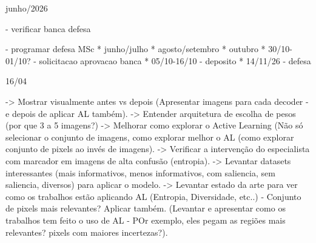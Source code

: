 
junho/2026

- verificar banca defesa

- programar defesa MSc
* junho/julho
* agosto/setembro
* outubro
* 30/10-01/10? - solicitacao aprovacao banca
* 05/10-16/10 - deposito
* 14/11/26 - defesa



16/04















    ->  Mostrar visualmente antes vs depois (Apresentar imagens para cada decoder - e depois de aplicar AL também).
    -> Entender arquitetura de escolha de pesos (por que 3 a 5 imagens?)
    -> Melhorar como explorar o Active Learning (Não só selecionar o conjunto de imagens, como explorar melhor o AL (como explorar conjunto de pixels ao invés de imagens).
    -> Verificar a intervenção do especialista com marcador em imagens de alta confusão (entropia).
    -> Levantar datasets interessantes (mais informativos, menos informativos, com saliencia, sem saliencia, diversos) para aplicar o modelo.
    -> Levantar estado da arte para ver como os trabalhos estão aplicando AL (Entropia, Diversidade, etc..) - Conjunto de pixels mais relevantes? Aplicar também. (Levantar e apresentar como os trabalhos tem feito o uso de AL - POr exemplo, eles pegam as regiões mais relevantes? pixels com maiores incertezas?).
    
    